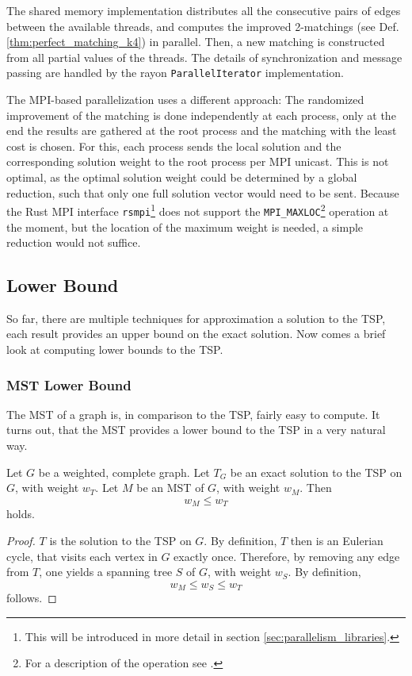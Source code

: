 The shared memory implementation distributes all the consecutive pairs of edges
between the available threads, and computes the improved 2-matchings (see Def. \ref{thm:perfect_matching_k4}) in parallel.
Then, a new matching is constructed from all partial values of the threads.
The details of synchronization and message passing are handled by the rayon \texttt{ParallelIterator} implementation.

The \ac{MPI}-based parallelization uses a different approach:
The randomized improvement of the matching is done independently at each process,
only at the end the results are gathered at the root process
and the matching with the least cost is chosen. For this,
each process sends the local solution and the corresponding solution weight
to the root process per \ac{MPI} unicast. This is not optimal,
as the optimal solution weight could be determined by a global reduction,
such that only one full solution vector would need to be sent.
Because the Rust \ac{MPI} interface
\texttt{rsmpi}\footnote{This will be introduced in more detail in section \ref{sec:parallelism_libraries}.}
does not support the
\texttt{MPI\_MAXLOC}\footnote{For a description of the operation see
  \cite[section 5.9.4]{message_passing_interface_forum_mpi_2015}.}
operation at the moment, but the location of the maximum weight is needed,
a simple reduction would not suffice.


\subsection{Lower Bound}

So far, there are multiple techniques for approximation a solution to the \ac{TSP},
each result provides an upper bound on the exact solution.
Now comes a brief look at computing lower bounds to the \ac{TSP}.

\subsubsection{MST Lower Bound}

The \ac{MST} of a graph is, in comparison to the \ac{TSP}, fairly easy to compute.
It turns out, that the \ac{MST} provides a lower bound to the \ac{TSP} in a very natural way.

\begin{theorem}
  Let $G$ be a weighted, complete graph. Let $T_G$ be an exact solution to the \ac{TSP} on $G$,
  with weight $w_T$.
  Let $M$ be an \ac{MST} of $G$, with weight $w_M$.
  Then $$w_M \leq w_T$$ holds.
  \label{thm:mst_lower_bound}
\end{theorem}
\begin{proof}
  $T$ is the solution to the \ac{TSP} on $G$. By definition, $T$ then is an Eulerian cycle,
  that visits each vertex in $G$ exactly once.
  Therefore, by removing any edge from $T$, one yields a spanning tree $S$ of $G$, with weight $w_S$.
  By definition, $$w_M \leq w_S \leq w_T$$ follows.
\end{proof}

